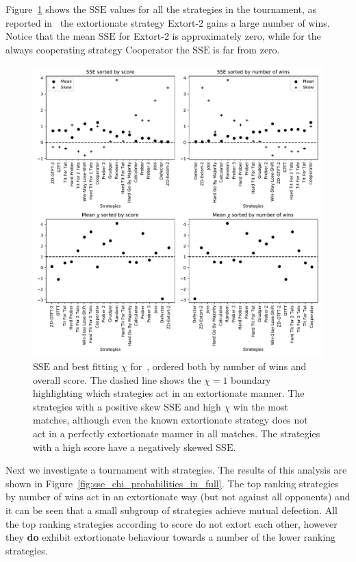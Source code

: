 \documentclass[a4paper]{article}
\newcommand{\SSe}{\text{SSE}}
\begin{document}
Figure~\ref{fig:sserror_in_stewart_plotkin} shows the
\(\SSe\) values for all the strategies in the tournament, as
reported in~\cite{Stewart2012} the extortionate strategy Extort-2 gains a large number of
wins. Notice that the mean \(\SSe\) for Extort-2 is approximately zero, while for
the always cooperating strategy Cooperator the \(\SSe\) is far from zero.

\begin{figure}[!htbp]
    \centering
    \includegraphics[width=.8\textwidth]{./assets/img/sserror_in_stewart_plotkin/main.pdf}
    \caption{\(\SSe\) and best fitting \(\chi\) for~\cite{Stewart2012},
        ordered both by number of wins and overall score. The dashed line shows
        the \(\chi=1\) boundary highlighting which strategies act in an
        extortionate manner. The strategies with a positive skew
        \(\SSe\) and high \(\chi\) win the most matches, although even the known
        extortionate strategy does not act in a perfectly extortionate manner in
        all matches. The strategies with a high score have a negatively skewed
        \(\SSe\).
        }
    \label{fig:sserror_in_stewart_plotkin}
\end{figure}

Next we investigate a tournament with
strategies. The results of
this analysis are shown in Figure~\ref{fig:sse_chi_probabilities_in_full}. The
top ranking strategies by number of wins act in an extortionate way (but not
against all opponents) and it can be seen that a small subgroup of strategies
achieve mutual defection.  All the top ranking strategies according to score
do not extort each other, however they
\textbf{do} exhibit extortionate behaviour towards a number of the lower ranking
strategies.
\end{document}
